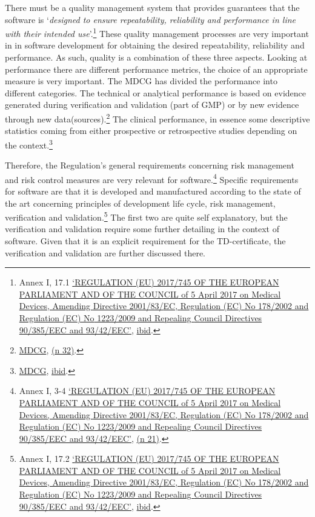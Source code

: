 \documentclass[
]{scrartcl}
\begin{document}
There must be a quality management system that provides guarantees that the software is `\emph{designed to ensure repeatability, reliability and performance in line with their intended use}'.\footnote{Annex I, 17.1 \protect\hyperlink{ref-REGULATIONEU2017a}{{`{REGULATION} ({EU}) 2017/745 {OF THE EUROPEAN PARLIAMENT AND OF THE COUNCIL} of 5 {April} 2017 on Medical Devices, Amending {Directive} 2001/83/{EC}, {Regulation} ({EC}) {No} 178/2002 and {Regulation} ({EC}) {No} 1223/2009 and Repealing {Council Directives} 90/385/{EEC} and 93/42/{EEC}'}}, \protect\hyperlink{ref-REGULATIONEU2017a}{ibid}.} These quality management processes are very important in in software development for obtaining the desired repeatability, reliability and performance. As such, quality is a combination of these three aspects. Looking at performance there are different performance metrics, the choice of an appropriate measure is very important. The MDCG has divided the performance into different categories. The technical or analytical performance is based on evidence generated during verification and validation (part of GMP) or by new evidence through new data(sources).\footnote{\protect\hyperlink{ref-mdcgGuidanceClinicalEvaluation2020}{MDCG}, \protect\hyperlink{ref-mdcgGuidanceClinicalEvaluation2020}{(n 32)}.} The clinical performance, in essence some descriptive statistics coming from either prospective or retrospective studies depending on the context.\footnote{\protect\hyperlink{ref-mdcgGuidanceClinicalEvaluation2020}{MDCG}, \protect\hyperlink{ref-mdcgGuidanceClinicalEvaluation2020}{ibid}.}

Therefore, the Regulation's general requirements concerning risk management and risk control measures are very relevant for software.\footnote{Annex I, 3-4 \protect\hyperlink{ref-REGULATIONEU2017a}{{`{REGULATION} ({EU}) 2017/745 {OF THE EUROPEAN PARLIAMENT AND OF THE COUNCIL} of 5 {April} 2017 on Medical Devices, Amending {Directive} 2001/83/{EC}, {Regulation} ({EC}) {No} 178/2002 and {Regulation} ({EC}) {No} 1223/2009 and Repealing {Council Directives} 90/385/{EEC} and 93/42/{EEC}'}}, \protect\hyperlink{ref-REGULATIONEU2017a}{(n 21)}.} Specific requirements for software are that it is developed and manufactured according to the state of the art concerning principles of development life cycle, risk management, verification and validation.\footnote{Annex I, 17.2 \protect\hyperlink{ref-REGULATIONEU2017a}{{`{REGULATION} ({EU}) 2017/745 {OF THE EUROPEAN PARLIAMENT AND OF THE COUNCIL} of 5 {April} 2017 on Medical Devices, Amending {Directive} 2001/83/{EC}, {Regulation} ({EC}) {No} 178/2002 and {Regulation} ({EC}) {No} 1223/2009 and Repealing {Council Directives} 90/385/{EEC} and 93/42/{EEC}'}}, \protect\hyperlink{ref-REGULATIONEU2017a}{ibid}.} The first two are quite self explanatory, but the verification and validation require some further detailing in the context of software. Given that it is an explicit requirement for the TD-certificate, the verification and validation are further discussed there.
\end{document}

